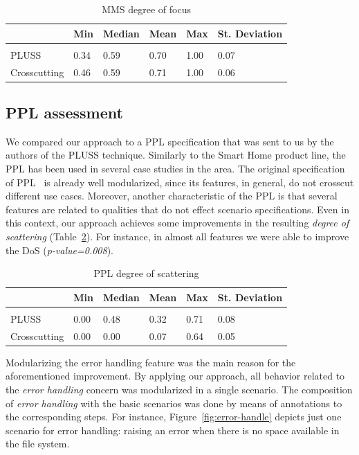 \documentclass{acm_proc_article-sp}
\begin{document}
\begin{table}[htb] \centering
\caption{MMS degree of focus}
\label{tab:mms-dof}
\begin{small}
\begin{tabular}{llllll} \hline
					& Min 	& Median 	& Mean 	& Max 	& St. Deviation \\ \hline \\
	PLUSS			& 0.34	& 0.59		& 0.70	& 1.00	& 0.07			\\
	Crosscutting	& 0.46  & 0.59   	& 0.71 	& 1.00 	& 0.06			\\ \hline	
\end{tabular}
\end{small}
\end{table}

\subsection{PPL assessment}

We compared our approach to a PPL specification that was sent to us by the
authors of the PLUSS technique. Similarly to the Smart Home product line, the PPL has been used in several case
studies in the area. The original specification of PPL~\cite{PPL:2008} is already well
modularized, since its features, in general, do not crosscut different
use cases. Moreover, another characteristic of the PPL is that several features
are related to qualities that do not effect scenario specifications.
Even in this context, our approach achieves some improvements in the
resulting \emph{degree of scattering} (Table~\ref{tab:ppl-dos}). For instance,
in almost all features we were able to improve the DoS (\emph{p-value=0.008}).


\begin{table}[htb] \centering
\caption{PPL degree of scattering}
\label{tab:ppl-dos}
\begin{small}
\begin{tabular}{llllll} \hline
					& Min 	& Median 	& Mean 	& Max 	& St. Deviation \\ \hline \\
	PLUSS			& 0.00	& 0.48		& 0.32	& 0.71	& 0.08			\\
	Crosscutting	& 0.00  & 0.00   	& 0.07 	& 0.64 	& 0.05			\\ \hline	
\end{tabular}
\end{small}
\end{table}


Modularizing the error handling feature was the main reason for the
aforementioned improvement. By applying our approach, all behavior related to
the \emph{error handling} concern was modularized in a single scenario. The
composition of \emph{error handling} with the basic scenarios was done by means
of annotations to the corresponding steps. For instance,
Figure~\ref{fig:error-handle} depicts just one scenario for error handling:
raising  an error when there is no space available in the file system.
\end{document}
